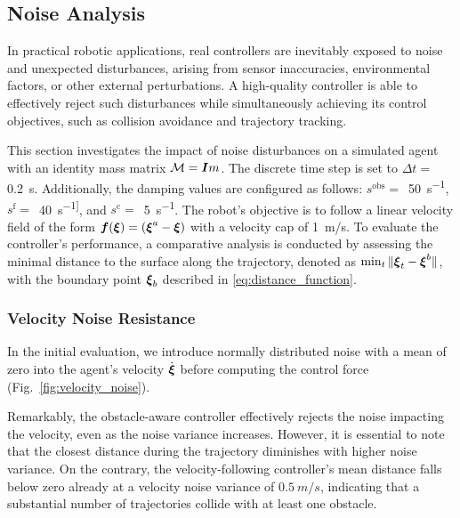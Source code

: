 \subsection{Noise Analysis}
In practical robotic applications, real controllers are inevitably exposed to noise and unexpected disturbances, arising from sensor inaccuracies, environmental factors, or other external perturbations. A high-quality controller is able to effectively reject such disturbances while simultaneously achieving its control objectives, such as collision avoidance and trajectory tracking.

This section investigates the impact of noise disturbances on a simulated agent with an identity mass matrix $\mathcal{M} = \boldsymbol{I} m$. The discrete time step is set to $\Delta t = $\qty{0.2}{s}. Additionally, the damping values are configured as follows: 
$s^{\mathrm{obs}}=$~\qty{50}{s^{-1}},
$s^{\mathrm{f}}=$~\qty{40}{s^{-1]}}, and
$s^{\mathrm{c}}=$~\qty{5}{s^{-1}}.
The robot's objective is to follow a linear velocity field of the form $\boldsymbol{f}(\boldsymbol{\xi}) = (\boldsymbol{\xi}^a - \boldsymbol{\xi})$ with a velocity cap of \qty{1}{m/s}.
To evaluate the controller's performance, a comparative analysis is conducted by assessing the minimal distance to the surface along the trajectory, denoted as $ \min_t \| \boldsymbol{\xi}_t - \boldsymbol{\xi}^b \| $, with the boundary point $\boldsymbol{\xi}_b$ described in \eqref{eq:distance_function}. 

\subsubsection{Velocity Noise Resistance}
In the initial evaluation, we introduce normally distributed noise with a mean of zero into the agent's velocity $\dot{\boldsymbol{ \xi}}$ before computing the control force (Fig.~\ref{fig:velocity_noise}). 

Remarkably, the obstacle-aware controller effectively rejects the noise impacting the velocity, even as the noise variance increases. However, it is essential to note that the closest distance during the trajectory diminishes with higher noise variance. On the contrary, the velocity-following controller's mean distance falls below zero already at a velocity noise variance of $\qty{0.5}{m/s}$, indicating that a substantial number of trajectories collide with at least one obstacle.

